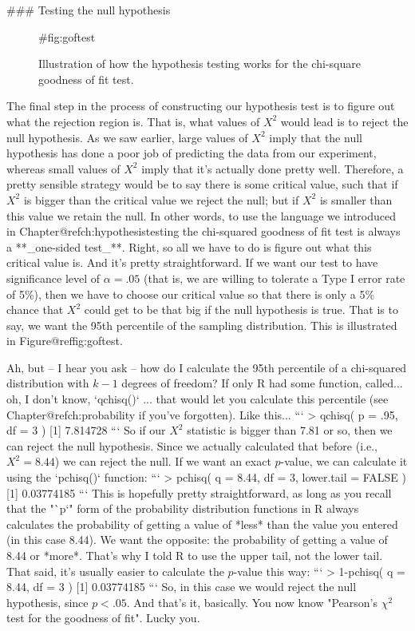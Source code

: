 ### Testing the null hypothesis 


\begin{figure}
\begin{center}
\caption{Illustration of how the hypothesis testing works for the chi-square goodness of fit test.}
{#fig:goftest}
\HR
\end{center}
\end{figure}

The final step in the process of constructing our hypothesis test is to figure out what the rejection region is. That is, what values of $X^2$ would lead is to reject the null hypothesis. As we saw earlier, large values of $X^2$ imply that the null hypothesis has done a poor job of predicting the data from our experiment, whereas small values of $X^2$ imply that it's actually done pretty well. Therefore, a pretty sensible strategy would be to say there is some critical value, such that if $X^2$ is bigger than the critical value we reject the null; but if $X^2$ is smaller than this value we retain the null. In other words, to use the language we introduced in Chapter@refch:hypothesistesting the chi-squared goodness of fit test is always a **_one-sided test_**. Right, so all we have to do is figure out what this critical value is. And it's pretty straightforward. If we want our test to have significance level of $\alpha = .05$ (that is, we are willing to tolerate a Type I error rate of 5\%), then we have to choose our critical value so that there is only a 5\% chance that $X^2$ could get to be that big if the null hypothesis is true. That is to say, we want the 95th percentile of the sampling distribution. This is illustrated in Figure@reffig:goftest.

Ah, but -- I hear you ask -- how do I calculate the 95th percentile of a chi-squared distribution with $k-1$ degrees of freedom? If only R had some function, called... oh, I don't know, `qchisq()` ... that would let you calculate this percentile (see Chapter@refch:probability if you've forgotten). Like this...
```
> qchisq( p = .95, df = 3 )
[1] 7.814728
```
So if our $X^2$ statistic is bigger than 7.81 or so, then we can reject the null hypothesis. Since we actually calculated that before (i.e., $X^2 = 8.44$) we can reject the null. If we want an exact $p$-value, we can calculate it using the `pchisq()` function:
```
> pchisq( q = 8.44, df = 3, lower.tail = FALSE )
[1] 0.03774185
```
This is hopefully pretty straightforward, as long as you recall that the "`p`" form of the probability distribution functions in R always calculates the probability of getting a value of *less* than the value you entered (in this case 8.44). We want the opposite: the probability of getting a value of 8.44 or *more*. That's why I told R to use the upper tail, not the lower tail. That said, it's usually easier to calculate the $p$-value this way:
```
> 1-pchisq( q = 8.44, df = 3 )
[1] 0.03774185
```
So, in this case we would reject the null hypothesis, since $p < .05$.  And that's it, basically. You now know "Pearson's $\chi^2$ test for the goodness of fit". Lucky you.


